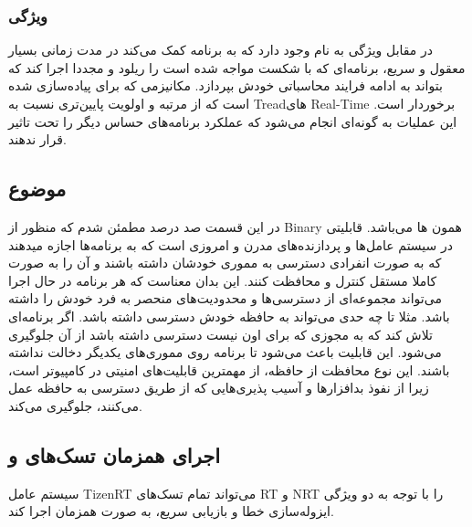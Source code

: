 \documentclass[10pt, a4paper]{article}
\begin{document}
\subsubsection{ویژگی }

در مقابل ویژگی به نام  وجود دارد که به برنامه کمک می‌کند در
مدت زمانی بسیار معقول و سریع، برنامه‌ای که با شکست مواجه شده‌ است را ریلود و
مجددا اجرا کند که بتواند به ادامه فرایند محاسباتی خودش بپردازد. مکانیزمی که برای
 پیاده‌سازی شده است که از مرتبه و اولویت پایین‌تری نسبت به
Treadهای Real-Time برخوردار است. این عملیات به گونه‌ای انجام می‌شود که عملکرد
برنامه‌های حساس دیگر  را تحت تاثیر قرار ندهند.

\subsection{موضوع }

در این قسمت صد درصد مطمئن شدم که منظور از Binary همون ها
می‌باشد. قابلیتی در سیستم عامل‌ها و پردازنده‌های مدرن و امروزی است که به
برنامه‌ها اجازه میدهند که به صورت انفرادی دسترسی به مموری خودشان داشته باشند و
آن را به صورت کاملا مستقل کنترل و محافظت کنند. این بدان معناست که هر برنامه در
حال اجرا می‌تواند مجموعه‌ای از دسترسی‌ها و محدودیت‌های منحصر به فرد خودش را
داشته باشد. مثلا تا چه حدی می‌تواند به حافظه خودش دسترسی داشته باشد. اگر
برنامه‌ای تلاش کند که به مجوزی که برای اون نیست دسترسی داشته باشد از آن جلوگیری
می‌شود. این قابلیت باعث می‌شود تا برنامه روی مموری‌های یکدیگر دخالت نداشته
باشند. این نوع محافظت از حافظه، از مهمترین قابلیت‌های امنیتی در کامپیوتر است،
زیرا از نفوذ بدافزار‌ها و آسیب پذیری‌هایی که از طریق دسترسی به حافظه عمل
می‌کنند، جلوگیری می‌کند.


\subsection{اجرای همزمان تسک‌های  و }

سیستم عامل TizenRT می‌تواند تمام تسک‌های RT و NRT را با توجه به دو ویژگی
ایزوله‌سازی خطا و بازیابی سریع، به صورت همزمان اجرا کند.
\end{document}
